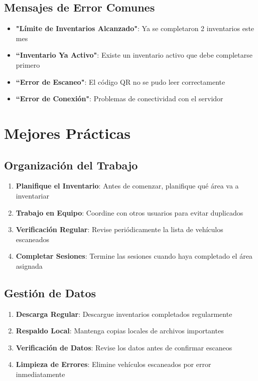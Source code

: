 \documentclass[11pt,a4paper]{article}
\begin{document}
\subsection{Mensajes de Error Comunes}

\begin{warningbox}
\begin{itemize}
    \item \textbf{"Límite de Inventarios Alcanzado"}: Ya se completaron 2 inventarios este mes
    \item \textbf{``Inventario Ya Activo"}: Existe un inventario activo que debe completarse primero
    \item \textbf{``Error de Escaneo"}: El código QR no se pudo leer correctamente
    \item \textbf{``Error de Conexión"}: Problemas de conectividad con el servidor
\end{itemize}
\end{warningbox}

\section{Mejores Prácticas}

\subsection{Organización del Trabajo}

\begin{enumerate}
    \item \textbf{Planifique el Inventario}: Antes de comenzar, planifique qué área va a inventariar
    \item \textbf{Trabajo en Equipo}: Coordine con otros usuarios para evitar duplicados
    \item \textbf{Verificación Regular}: Revise periódicamente la lista de vehículos escaneados
    \item \textbf{Completar Sesiones}: Termine las sesiones cuando haya completado el área asignada
\end{enumerate}

\subsection{Gestión de Datos}

\begin{enumerate}
    \item \textbf{Descarga Regular}: Descargue inventarios completados regularmente
    \item \textbf{Respaldo Local}: Mantenga copias locales de archivos importantes
    \item \textbf{Verificación de Datos}: Revise los datos antes de confirmar escaneos
    \item \textbf{Limpieza de Errores}: Elimine vehículos escaneados por error inmediatamente
\end{enumerate}
\end{document}
